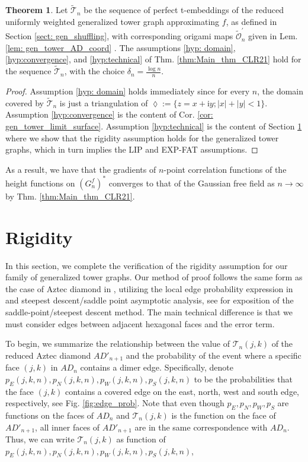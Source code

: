\documentclass[12pt]{amsart}
\newcommand{\cT}{\mathcal T}
\numberwithin{equation}{section}
\theoremstyle{definition}
\newtheorem{thm}{Theorem}[section]
\begin{document}
\begin{thm}
    \label{thm: main_thm_generalized_tower}
    Let $\widetilde{ \mathcal{T}}_n$ be the sequence of perfect t-embeddings of the reduced uniformly weighted generalized tower graph approximating $f$, as defined in Section \ref{sect: gen_shuffling}, with corresponding origami maps $\widetilde{\mathcal{O}}_n^{\prime}$ given in Lem. \ref{lem: gen_tower_AD_coord} . The assumptions \ref{hyp: domain}, \ref{hyp:convergence}, and \ref{hyp:technical} of Thm. \ref{thm:Main_thm_CLR21} hold for the sequence $\widetilde{\mathcal{T}}_n$, with the choice $\displaystyle\delta_n=\frac{\log n}{n}$.
\end{thm}

\begin{proof}
    Assumption \ref{hyp: domain} holds immediately since for every $n$, the domain covered by $\widetilde{\cT}_n$ is just a triangulation of $\lozenge:=\{z=x+\mathrm i y; |x|+|y|<1\}.$ Assumption \ref{hyp:convergence} is the content of  Cor. \ref{cor: gen_tower_limit_surface}. Assumption \ref{hyp:technical} is the content of Section \ref{sect: rigidity} where we show that the rigidity assumption holds for the generalized tower graphs, which in turn implies the LIP and EXP-FAT assumptions. 
\end{proof}

As a result, we have that the gradients of
$n$-point correlation functions of the height functions on $(G^f_n)^*$ converges to that of the Gaussian free field as $n \to \infty$ by Thm. \ref{thm:Main_thm_CLR21}.

\section{Rigidity}\label{sect: rigidity}

In this section, we complete the verification of the rigidity assumption for our family of generalized tower graphs. Our method of proof follows the same form as the case of Aztec diamond in \cite{tower_AD_perfect}, utilizing the local edge probability expression in \cite{CEP, MR3325273} and steepest descent/saddle point asymptotic analysis, see \cite{deBruijn81} for exposition of the saddle-point/steepest descent method. The main technical difference is that we must consider edges between adjacent hexagonal faces and the error term.


To begin, we summarize the relationship between the value of $\cT_{n}(j,k)$ of the reduced Aztec diamond $AD'_{n+1}$ and the probability of the event where a specific face $(j,k)$ in $AD_n$ contains a dimer edge. Specifically, denote $p_E(j, k, n), p_N(j, k, n), p_W(j, k, n), p_S(j, k, n)$ to be the probabilities that the face $(j,k)$ contains a covered edge on the east, north, west and south edge, respectively, see Fig. \ref{fig:edge_prob}. Note that even though $p_E, p_N, p_W, p_S$ are functions on the faces of $AD_n$ and $\cT_n(j,k)$ is the function on the face of $AD'_{n+1}$, all inner faces of $AD'_{n+1}$ are in the same correspondence with $AD_n$. Thus, we can write $\cT_n(j,k)$ as function of $p_E(j,k,n), p_N(j,k,n), p_W(j,k,n), p_S(j,k,n)$, 
\end{document}
